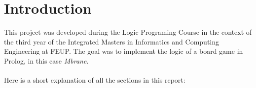 \documentclass[a4paper]{article}
\begin{document}
\newpage

\tableofcontents



\newpage

\section{Introduction}
\paragraph{}
This project was developed during the Logic Programing Course in the context of the third year of the Integrated Masters in Informatics 
and Computing Engineering at FEUP. The goal was to implement the logic of a board game in Prolog, in this case \textit{Mbrane}.

\paragraph{}
Here is a short explanation of all the sections in this report:
\end{document}
